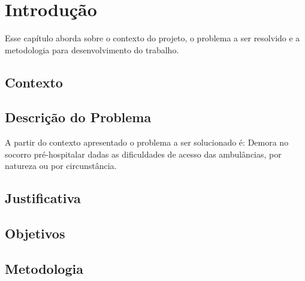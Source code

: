 \chapter[Introdução]{Introdução}\label{cap1}
	Esse capítulo aborda sobre o contexto do projeto, o problema a ser resolvido e a metodologia para desenvolvimento do trabalho. 

\section{Contexto}
  

\section{Descrição do Problema}

A partir do contexto apresentado o problema a ser solucionado é:
Demora no socorro pré-hospitalar dadas as dificuldades de acesso das ambulâncias, por natureza ou por circunstância.
  
\section{Justificativa}
  

\section{Objetivos}
  


\section{Metodologia}
   

